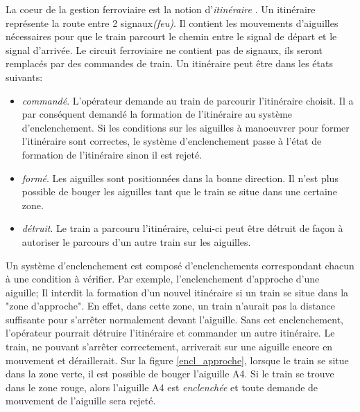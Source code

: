 La coeur de la gestion
  ferroviaire est la notion d'\emph{itinéraire} \cite{siteferro}. Un itinéraire
  représente la route entre 2 signaux\emph{(feu)}. Il contient les mouvements
  d'aiguilles nécessaires pour que le train parcourt le chemin entre le
  signal de départ et le signal d'arrivée. Le circuit ferroviaire ne
  contient pas de signaux, ils seront remplacés par des commandes de
  train. Un itinéraire peut être dans les états suivants:
  \begin{itemize}
    \item \emph{commandé}. L'opérateur demande au train de parcourir
      l'itinéraire choisit. Il a par conséquent demandé la formation de
      l'itinéraire au système d'enclenchement. Si les conditions sur
      les aiguilles à manoeuvrer pour former l'itinéraire sont
      correctes, le système d'enclenchement passe à l'état de formation de
      l'itinéraire sinon il est rejeté.
    \item \emph{formé}. Les aiguilles sont positionnées dans la bonne
      direction. Il n'est plus possible de bouger les aiguilles tant
      que le train se situe dans une certaine zone.
    \item \emph{détruit}. Le train a parcouru l'itinéraire, celui-ci peut
      être détruit de façon à autoriser le parcours d'un autre train sur les
      aiguilles.  
  \end{itemize}


Un système d'enclenchement est composé d'enclenchements correspondant
chacun à une condition à vérifier. Par exemple, l'{enclenchement
d'approche d'une aiguille}; Il interdit la formation d'un 
nouvel itinéraire si un train se situe dans la "zone d'approche".
En effet, dans cette zone, un train
n'aurait pas la distance suffisante pour s'arrêter normalement devant
l'aiguille.  Sans cet enclenchement, l'opérateur pourrait détruire
l'itinéraire et commander un autre itinéraire. Le train, ne pouvant
s'arrêter correctement, arriverait sur une aiguille encore en
mouvement et déraillerait.
Sur la figure \ref{encl_approche}, lorsque le train se situe dans la
zone verte, il est possible de bouger l'aiguille A4. Si le train se
trouve dans le zone rouge, alors l'aiguille A4 est \emph{enclenchée}
et toute demande de mouvement de l'aiguille sera rejeté.


